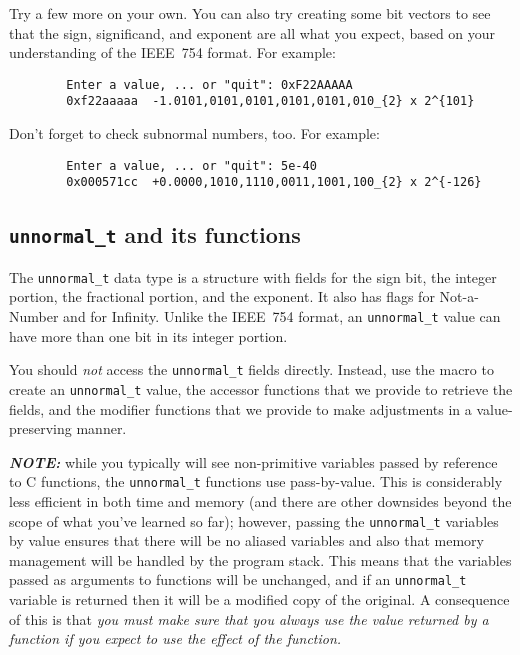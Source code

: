 Try a few more on your own.
You can also try creating some bit vectors to see that the sign, significand, and exponent are all what you expect, based on your understanding of the IEEE~754 format.
For example:

\begin{verbatim}
        Enter a value, ... or "quit": 0xF22AAAAA
        0xf22aaaaa	-1.0101,0101,0101,0101,0101,010_{2} x 2^{101}
\end{verbatim}

Don't forget to check subnormal numbers, too.
For example:

\begin{verbatim}
        Enter a value, ... or "quit": 5e-40
        0x000571cc	+0.0000,1010,1110,0011,1001,100_{2} x 2^{-126}
\end{verbatim}

\subsection{\texttt{unnormal\_t} and its functions} \label{subsec:unnormal}

The \lstinline{unnormal_t} data type is a structure with fields for the sign bit, the integer portion, the fractional portion, and the exponent.
It also has flags for Not-a-Number and for Infinity.
Unlike the IEEE~754 format, an \lstinline{unnormal_t} value can have more than one bit in its integer portion.

You should \textit{not} access the \lstinline{unnormal_t} fields directly.
Instead, use the  macro to create an \lstinline{unnormal_t} value, the accessor functions that we provide to retrieve the fields, and the modifier functions that we provide to make adjustments in a value-preserving manner.

\textit{\textbf{NOTE:}} while you typically will see non-primitive variables passed by reference to C functions, the \lstinline{unnormal_t} functions use pass-by-value.
This is considerably less efficient in both time and memory (and there are other downsides beyond the scope of what you've learned so far);
however, passing the \lstinline{unnormal_t} variables by value ensures that there will be no aliased variables and also that memory management will be handled by the program stack.
This means that the variables passed as arguments to functions will be unchanged, and if an \lstinline{unnormal_t} variable is returned then it will be a modified copy of the original.
A consequence of this is that \textit{you must make sure that you always use the value returned by a function if you expect to use the effect of the function.}

